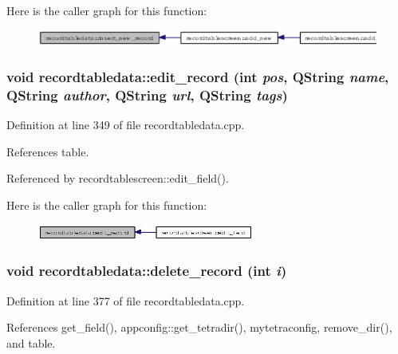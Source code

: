 Here is the caller graph for this function:\begin{figure}[H]
\begin{center}
\leavevmode
\includegraphics[width=335pt]{classrecordtabledata_15f519acd76fc58f882e5a5d78105c61_icgraph}
\end{center}
\end{figure}
\subsubsection{\setlength{\rightskip}{0pt plus 5cm}void recordtabledata::edit\_\-record (int {\em pos}, QString {\em name}, QString {\em author}, QString {\em url}, QString {\em tags})}\label{classrecordtabledata_437205c90b9d57a3431b1677cef71c01}




Definition at line 349 of file recordtabledata.cpp.

References table.

Referenced by recordtablescreen::edit\_\-field().

Here is the caller graph for this function:\begin{figure}[H]
\begin{center}
\leavevmode
\includegraphics[width=202pt]{classrecordtabledata_437205c90b9d57a3431b1677cef71c01_icgraph}
\end{center}
\end{figure}
\subsubsection{\setlength{\rightskip}{0pt plus 5cm}void recordtabledata::delete\_\-record (int {\em i})}\label{classrecordtabledata_79b4a42221e3838aedc8063901fd77a3}




Definition at line 377 of file recordtabledata.cpp.

References get\_\-field(), appconfig::get\_\-tetradir(), mytetraconfig, remove\_\-dir(), and table.

